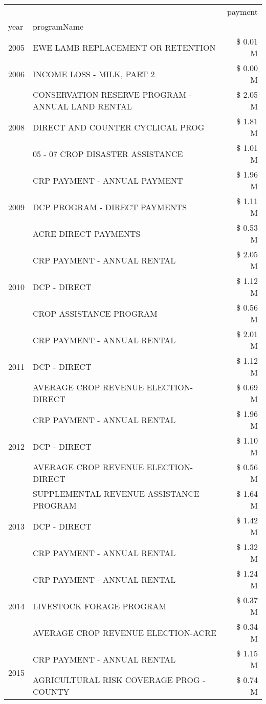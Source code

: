 \begin{tabular}{llr}
\toprule
 &  & payment \\
year & programName &  \\
\midrule
2005 & EWE LAMB REPLACEMENT OR RETENTION & \$ 0.01 M \\
\cline{1-3}
2006 & INCOME LOSS - MILK, PART 2 & \$ 0.00 M \\
\cline{1-3}
\multirow[t]{3}{*}{2008} & CONSERVATION RESERVE PROGRAM - ANNUAL LAND RENTAL & \$ 2.05 M \\
 & DIRECT AND COUNTER CYCLICAL PROG & \$ 1.81 M \\
 & 05 - 07 CROP DISASTER ASSISTANCE & \$ 1.01 M \\
\cline{1-3}
\multirow[t]{3}{*}{2009} & CRP PAYMENT - ANNUAL PAYMENT & \$ 1.96 M \\
 & DCP PROGRAM - DIRECT PAYMENTS & \$ 1.11 M \\
 & ACRE DIRECT PAYMENTS & \$ 0.53 M \\
\cline{1-3}
\multirow[t]{3}{*}{2010} & CRP PAYMENT - ANNUAL RENTAL & \$ 2.05 M \\
 & DCP - DIRECT & \$ 1.12 M \\
 & CROP ASSISTANCE PROGRAM & \$ 0.56 M \\
\cline{1-3}
\multirow[t]{3}{*}{2011} & CRP PAYMENT - ANNUAL RENTAL & \$ 2.01 M \\
 & DCP - DIRECT & \$ 1.12 M \\
 & AVERAGE CROP REVENUE ELECTION-DIRECT & \$ 0.69 M \\
\cline{1-3}
\multirow[t]{3}{*}{2012} & CRP PAYMENT - ANNUAL RENTAL & \$ 1.96 M \\
 & DCP - DIRECT & \$ 1.10 M \\
 & AVERAGE CROP REVENUE ELECTION-DIRECT & \$ 0.56 M \\
\cline{1-3}
\multirow[t]{3}{*}{2013} & SUPPLEMENTAL REVENUE ASSISTANCE PROGRAM & \$ 1.64 M \\
 & DCP - DIRECT & \$ 1.42 M \\
 & CRP PAYMENT - ANNUAL RENTAL & \$ 1.32 M \\
\cline{1-3}
\multirow[t]{3}{*}{2014} & CRP PAYMENT - ANNUAL RENTAL & \$ 1.24 M \\
 & LIVESTOCK FORAGE PROGRAM & \$ 0.37 M \\
 & AVERAGE CROP REVENUE ELECTION-ACRE & \$ 0.34 M \\
\cline{1-3}
\multirow[t]{3}{*}{2015} & CRP PAYMENT - ANNUAL RENTAL & \$ 1.15 M \\
 & AGRICULTURAL RISK COVERAGE PROG - COUNTY & \$ 0.74 M \\

\end{tabular}

